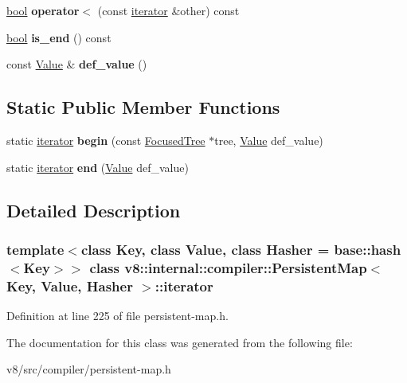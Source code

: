 \begin{DoxyCompactItemize}
\mbox{\hyperlink{classbool}{bool}} {\bfseries operator$<$} (const \mbox{\hyperlink{classv8_1_1internal_1_1compiler_1_1PersistentMap_1_1iterator}{iterator}} \&other) const
\item 
\mbox{\label{classv8_1_1internal_1_1compiler_1_1PersistentMap_1_1iterator_ad9b547adbf258822305172e25a88307f}} 
\mbox{\hyperlink{classbool}{bool}} {\bfseries is\+\_\+end} () const
\item 
\mbox{\label{classv8_1_1internal_1_1compiler_1_1PersistentMap_1_1iterator_a91275c68cb28937cb329f05863377886}} 
const \mbox{\hyperlink{classv8_1_1Value}{Value}} \& {\bfseries def\+\_\+value} ()
\end{DoxyCompactItemize}
\subsection*{Static Public Member Functions}
\begin{DoxyCompactItemize}
\item 
\mbox{\label{classv8_1_1internal_1_1compiler_1_1PersistentMap_1_1iterator_a3d835f23a73f5a11aebc76a09a2e9313}} 
static \mbox{\hyperlink{classv8_1_1internal_1_1compiler_1_1PersistentMap_1_1iterator}{iterator}} {\bfseries begin} (const \mbox{\hyperlink{structv8_1_1internal_1_1compiler_1_1PersistentMap_1_1FocusedTree}{Focused\+Tree}} $\ast$tree, \mbox{\hyperlink{classv8_1_1Value}{Value}} def\+\_\+value)
\item 
\mbox{\label{classv8_1_1internal_1_1compiler_1_1PersistentMap_1_1iterator_a30a61f4b32a3429dab653b2e90bdc9a5}} 
static \mbox{\hyperlink{classv8_1_1internal_1_1compiler_1_1PersistentMap_1_1iterator}{iterator}} {\bfseries end} (\mbox{\hyperlink{classv8_1_1Value}{Value}} def\+\_\+value)
\end{DoxyCompactItemize}


\subsection{Detailed Description}
\subsubsection*{template$<$class Key, class Value, class Hasher = base\+::hash$<$\+Key$>$$>$\newline
class v8\+::internal\+::compiler\+::\+Persistent\+Map$<$ Key, Value, Hasher $>$\+::iterator}



Definition at line 225 of file persistent-\/map.\+h.



The documentation for this class was generated from the following file\+:\begin{DoxyCompactItemize}
\item 
v8/src/compiler/persistent-\/map.\+h\end{DoxyCompactItemize}
